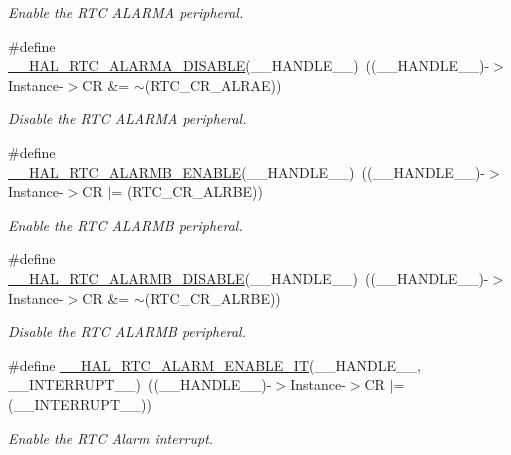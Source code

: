 \begin{DoxyCompactItemize}
\begin{DoxyCompactList}\small\item\em Enable the R\+TC A\+L\+A\+R\+MA peripheral. \end{DoxyCompactList}\item 
\#define \hyperlink{group___r_t_c___exported___macros_ga8679ec8def03e05fa39474d83b156699}{\+\_\+\+\_\+\+H\+A\+L\+\_\+\+R\+T\+C\+\_\+\+A\+L\+A\+R\+M\+A\+\_\+\+D\+I\+S\+A\+B\+LE}(\+\_\+\+\_\+\+H\+A\+N\+D\+L\+E\+\_\+\+\_\+)~((\+\_\+\+\_\+\+H\+A\+N\+D\+L\+E\+\_\+\+\_\+)-\/$>$Instance-\/$>$CR \&= $\sim$(R\+T\+C\+\_\+\+C\+R\+\_\+\+A\+L\+R\+AE))
\begin{DoxyCompactList}\small\item\em Disable the R\+TC A\+L\+A\+R\+MA peripheral. \end{DoxyCompactList}\item 
\#define \hyperlink{group___r_t_c___exported___macros_gad643ef2342067f140114d49f28709e92}{\+\_\+\+\_\+\+H\+A\+L\+\_\+\+R\+T\+C\+\_\+\+A\+L\+A\+R\+M\+B\+\_\+\+E\+N\+A\+B\+LE}(\+\_\+\+\_\+\+H\+A\+N\+D\+L\+E\+\_\+\+\_\+)~((\+\_\+\+\_\+\+H\+A\+N\+D\+L\+E\+\_\+\+\_\+)-\/$>$Instance-\/$>$CR $\vert$= (R\+T\+C\+\_\+\+C\+R\+\_\+\+A\+L\+R\+BE))
\begin{DoxyCompactList}\small\item\em Enable the R\+TC A\+L\+A\+R\+MB peripheral. \end{DoxyCompactList}\item 
\#define \hyperlink{group___r_t_c___exported___macros_ga09c7dd312682d270a8b74bcac3450f8b}{\+\_\+\+\_\+\+H\+A\+L\+\_\+\+R\+T\+C\+\_\+\+A\+L\+A\+R\+M\+B\+\_\+\+D\+I\+S\+A\+B\+LE}(\+\_\+\+\_\+\+H\+A\+N\+D\+L\+E\+\_\+\+\_\+)~((\+\_\+\+\_\+\+H\+A\+N\+D\+L\+E\+\_\+\+\_\+)-\/$>$Instance-\/$>$CR \&= $\sim$(R\+T\+C\+\_\+\+C\+R\+\_\+\+A\+L\+R\+BE))
\begin{DoxyCompactList}\small\item\em Disable the R\+TC A\+L\+A\+R\+MB peripheral. \end{DoxyCompactList}\item 
\#define \hyperlink{group___r_t_c___exported___macros_gab40f07ff2cdf6fc98ccfdd856ba934e4}{\+\_\+\+\_\+\+H\+A\+L\+\_\+\+R\+T\+C\+\_\+\+A\+L\+A\+R\+M\+\_\+\+E\+N\+A\+B\+L\+E\+\_\+\+IT}(\+\_\+\+\_\+\+H\+A\+N\+D\+L\+E\+\_\+\+\_\+,  \+\_\+\+\_\+\+I\+N\+T\+E\+R\+R\+U\+P\+T\+\_\+\+\_\+)~((\+\_\+\+\_\+\+H\+A\+N\+D\+L\+E\+\_\+\+\_\+)-\/$>$Instance-\/$>$CR $\vert$= (\+\_\+\+\_\+\+I\+N\+T\+E\+R\+R\+U\+P\+T\+\_\+\+\_\+))
\begin{DoxyCompactList}\small\item\em Enable the R\+TC Alarm interrupt. \end{DoxyCompactList}\item 

\end{DoxyCompactItemize}
